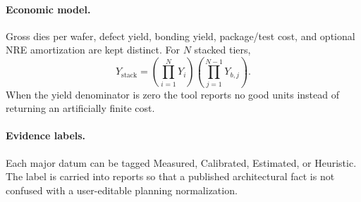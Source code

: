\paragraph{Economic model.}
Gross dies per wafer, defect yield, bonding yield, package/test cost, and optional NRE amortization are kept distinct. For $N$ stacked tiers,
\begin{equation}
Y_{\mathrm{stack}}=\left(\prod_{i=1}^{N}Y_i\right)\left(\prod_{j=1}^{N-1}Y_{b,j}\right).
\end{equation}
When the yield denominator is zero the tool reports no good units instead of returning an artificially finite cost.

\paragraph{Evidence labels.}
Each major datum can be tagged Measured, Calibrated, Estimated, or Heuristic. The label is carried into reports so that a published architectural fact is not confused with a user-editable planning normalization.

